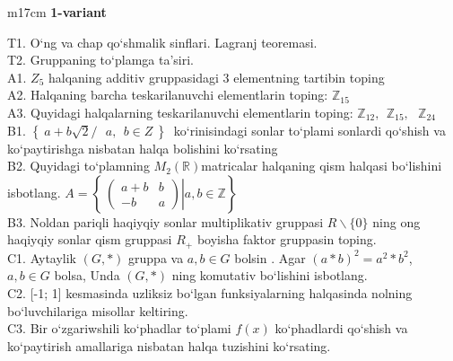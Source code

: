 \documentclass{article}
\begin{document}


\begin{tabular}{m{17cm}}
\textbf{1-variant}
\newline

T1. O`ng va chap qo`shmalik sinflari. Lagranj teoremasi. \\
T2. Gruppaning to`plamga ta'siri. \\
A1. \(Z_{5}\) halqaning additiv gruppasidagi 3 elementning tartibin toping \\
A2. Halqaning barcha teskarilanuvchi elementlarin toping: \(\mathbb{Z}_{15}\) \\
A3. Quyidagi halqalarning teskarilanuvchi elementlarin toping: \(\mathbb{Z}_{12},\ \ \mathbb{Z}_{15},\ \ \ \mathbb{Z}_{24}\) \\
B1. \(\left\{ \left. \ a + b\sqrt{2}/\ \ \ a,\ \ b \in Z\  \right\} \right.\ \) ko`rinisindagi sonlar to`plami sonlardi qo`shish va ko`paytirishga nisbatan halqa bolishini ko`rsating \\
B2. Quyidagi to`plamning \(M_{2}(\mathbb{R})\)matricalar halqaning qism halqasi bo`lishini isbotlang. \(A = \left\{ \left. \ \begin{pmatrix}
a + b & b \\
 - b & a
\end{pmatrix} \right|a,b\mathbb{\in Z} \right\}\) \\
B3. Noldan pariqli haqiyqiy sonlar multiplikativ gruppasi \(R\backslash\{ 0\}\) ning o\textquotesingle ng haqiyqiy sonlar qism gruppasi \(R_{+}\) boyisha faktor gruppasin toping. \\
C1. Aytaylik \((G,*)\) gruppa va \(a,b \in G\) bo\textquotesingle lsin . Agar \((a*b)^{2} = a^{2}*b^{2}\), \(a,b \in G\) bolsa, Unda \((G,*)\) ning komutativ bo`lishini isbotlang. \\
C2. {[}-1; 1{]} kesmasinda uzliksiz bo`lgan funksiyalarning halqasinda nolning bo`luvchilariga misollar keltiring. \\
C3. Bir o`zgariwshili ko`phadlar to`plami \(f(x)\) ko`phadlardi qo`shish va ko`paytirish amallariga nisbatan halqa tuzishini ko`rsating. \\

\end{tabular}
\vspace{1cm}
\end{document}
